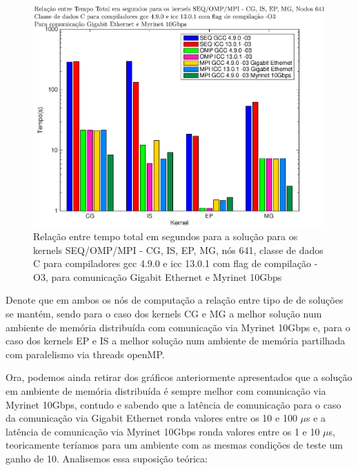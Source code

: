 \documentclass[conference,compsoc]{IEEEtran}
\begin{document}
\begin{figure}[H]
\centering
\includegraphics[width=1.1\columnwidth]{EPS/MPI/641/TIME_seq_vs_mpi_omp-gcc_vs_icc_641.eps}
\caption{Relação entre tempo total em segundos para a solução para os kernels SEQ/OMP/MPI - CG, IS, EP, MG, nós 641, classe de dados C para compiladores gcc 4.9.0 e icc 13.0.1 com flag de compilação  -O3, para comunicação Gigabit Ethernet e Myrinet 10Gbps}
\label{tempos_641}
\end{figure}

Denote que em ambos os nós de computação a relação entre tipo de de soluções  se mantém, sendo para o caso dos kernels CG e MG a melhor solução num ambiente de memória distribuída com comunicação via Myrinet 10Gbps e, para o caso dos kernels EP e IS a melhor solução num ambiente de memória partilhada com paralelismo via threads openMP.\par 
Ora, podemos ainda retirar dos gráficos anteriormente apresentados que a solução em ambiente de memória distribuída é sempre melhor com comunicação via Myrinet 10Gbps, contudo e sabendo que a latência de comunicação para o caso da comunicação via Gigabit Ethernet ronda valores entre os 10 e 100 $\mu$s e a latência de comunicação via Myrinet 10Gbps ronda valores entre os 1 e 10 $\mu$s, teoricamente teríamos para um ambiente com as mesmas condições de teste um ganho de 10. Analisemos essa suposição teórica:
\end{document}
